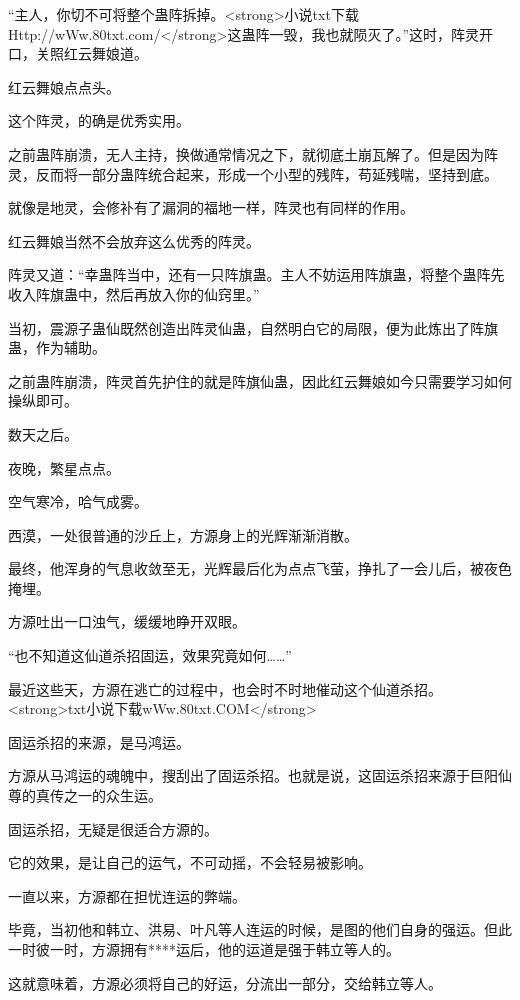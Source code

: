 
\begin{this_body}

“主人，你切不可将整个蛊阵拆掉。<strong>小说txt下载Http://wWw.80txt.com/</strong>这蛊阵一毁，我也就陨灭了。”这时，阵灵开口，关照红云舞娘道。

红云舞娘点点头。

这个阵灵，的确是优秀实用。

之前蛊阵崩溃，无人主持，换做通常情况之下，就彻底土崩瓦解了。但是因为阵灵，反而将一部分蛊阵统合起来，形成一个小型的残阵，苟延残喘，坚持到底。

就像是地灵，会修补有了漏洞的福地一样，阵灵也有同样的作用。

红云舞娘当然不会放弃这么优秀的阵灵。

阵灵又道：“幸蛊阵当中，还有一只阵旗蛊。主人不妨运用阵旗蛊，将整个蛊阵先收入阵旗蛊中，然后再放入你的仙窍里。”

当初，震源子蛊仙既然创造出阵灵仙蛊，自然明白它的局限，便为此炼出了阵旗蛊，作为辅助。

之前蛊阵崩溃，阵灵首先护住的就是阵旗仙蛊，因此红云舞娘如今只需要学习如何操纵即可。

数天之后。

夜晚，繁星点点。

空气寒冷，哈气成雾。

西漠，一处很普通的沙丘上，方源身上的光辉渐渐消散。

最终，他浑身的气息收敛至无，光辉最后化为点点飞萤，挣扎了一会儿后，被夜色掩埋。

方源吐出一口浊气，缓缓地睁开双眼。

“也不知道这仙道杀招固运，效果究竟如何……”

最近这些天，方源在逃亡的过程中，也会时不时地催动这个仙道杀招。<strong>txt小说下载wWw.80txt.COM</strong>

固运杀招的来源，是马鸿运。

方源从马鸿运的魂魄中，搜刮出了固运杀招。也就是说，这固运杀招来源于巨阳仙尊的真传之一的众生运。

固运杀招，无疑是很适合方源的。

它的效果，是让自己的运气，不可动摇，不会轻易被影响。

一直以来，方源都在担忧连运的弊端。

毕竟，当初他和韩立、洪易、叶凡等人连运的时候，是图的他们自身的强运。但此一时彼一时，方源拥有****运后，他的运道是强于韩立等人的。

这就意味着，方源必须将自己的好运，分流出一部分，交给韩立等人。


\end{this_body}
